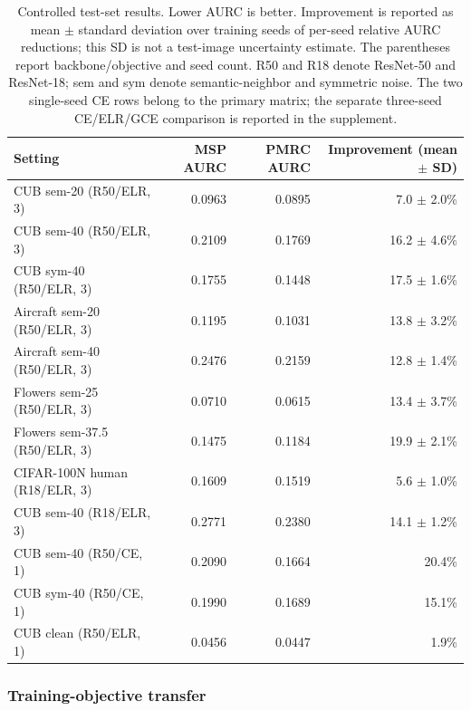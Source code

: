 \documentclass[review,times]{elsarticle}
\newcommand{\method}{PMRC}
\begin{document}
\begin{table}[t]
\centering
\caption{Controlled test-set results. Lower AURC is better. Improvement is
reported as mean $\pm$ standard deviation over training seeds of per-seed
relative AURC reductions; this SD is not a test-image uncertainty estimate.
The parentheses report backbone/objective and seed count. R50 and R18 denote
ResNet-50 and ResNet-18; sem and sym denote semantic-neighbor and symmetric
noise. The two single-seed CE rows belong to the primary matrix; the separate
three-seed CE/ELR/GCE comparison is reported in the supplement.}
\label{tab:controlled}
\fontsize{10}{12}\selectfont
\setlength{\tabcolsep}{4pt}
\begin{tabularx}{\textwidth}{@{}>{\raggedright\arraybackslash}Xrrr@{}}
\toprule
Setting & MSP AURC & \method{} AURC & \shortstack{Improvement\\(mean $\pm$ SD)} \\
\midrule
CUB sem-20 (R50/ELR, 3) & 0.0963 & 0.0895 & 7.0 $\pm$ 2.0\% \\
CUB sem-40 (R50/ELR, 3) & 0.2109 & 0.1769 & 16.2 $\pm$ 4.6\% \\
CUB sym-40 (R50/ELR, 3) & 0.1755 & 0.1448 & 17.5 $\pm$ 1.6\% \\
Aircraft sem-20 (R50/ELR, 3) & 0.1195 & 0.1031 & 13.8 $\pm$ 3.2\% \\
Aircraft sem-40 (R50/ELR, 3) & 0.2476 & 0.2159 & 12.8 $\pm$ 1.4\% \\
Flowers sem-25 (R50/ELR, 3) & 0.0710 & 0.0615 & 13.4 $\pm$ 3.7\% \\
Flowers sem-37.5 (R50/ELR, 3) & 0.1475 & 0.1184 & 19.9 $\pm$ 2.1\% \\
CIFAR-100N human (R18/ELR, 3) & 0.1609 & 0.1519 & 5.6 $\pm$ 1.0\% \\
CUB sem-40 (R18/ELR, 3) & 0.2771 & 0.2380 & 14.1 $\pm$ 1.2\% \\
CUB sem-40 (R50/CE, 1) & 0.2090 & 0.1664 & 20.4\% \\
CUB sym-40 (R50/CE, 1) & 0.1990 & 0.1689 & 15.1\% \\
CUB clean (R50/ELR, 1) & 0.0456 & 0.0447 & 1.9\% \\
\bottomrule
\end{tabularx}
\end{table}

\subsubsection{Training-objective transfer}
\end{document}
